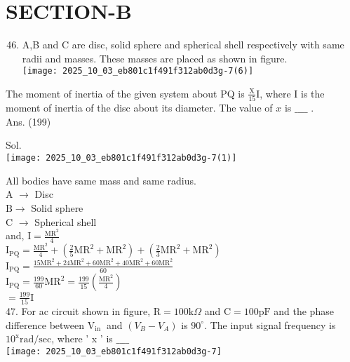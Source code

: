 \documentclass[10pt]{article}
\begin{document}
\section*{SECTION-B}
\begin{enumerate}
  \setcounter{enumi}{45}
  \item A,B and C are disc, solid sphere and spherical shell respectively with same radii and masses. These masses are placed as shown in figure.\\
\texttt{[image: 2025\_10\_03\_eb801c1f491f312ab0d3g-7(6)]}
\end{enumerate}

The moment of inertia of the given system about PQ is \(\frac{\mathrm{X}}{15} \mathrm{I}\), where I is the moment of inertia of the disc about its diameter. The value of \(x\) is \(\_\_\_\_\) .\\
Ans. (199)

Sol.\\
\texttt{[image: 2025\_10\_03\_eb801c1f491f312ab0d3g-7(1)]}

All bodies have same mass and same radius.\\
A \(\rightarrow\) Disc\\
\(\mathrm{B} \rightarrow\) Solid sphere\\
C \(\rightarrow\) Spherical shell\\
and, \(\mathrm{I}=\frac{\mathrm{MR}^{2}}{4}\)\\
\(\mathrm{I}_{\mathrm{PQ}}=\frac{\mathrm{MR}^{2}}{4}+\left(\frac{2}{5} \mathrm{MR}^{2}+\mathrm{MR}^{2}\right)+\left(\frac{2}{3} \mathrm{MR}^{2}+\mathrm{MR}^{2}\right)\)\\
\(\mathrm{I}_{\mathrm{PQ}}=\frac{15 \mathrm{MR}^{2}+24 \mathrm{MR}^{2}+60 \mathrm{MR}^{2}+40 \mathrm{MR}^{2}+60 \mathrm{MR}^{2}}{60}\)\\
\(\mathrm{I}_{\mathrm{PQ}}=\frac{199}{60} \mathrm{MR}^{2}=\frac{199}{15}\left(\frac{\mathrm{MR}^{2}}{4}\right)\)\\
\(=\frac{199}{15} \mathrm{I}\)\\
47. For ac circuit shown in figure, \(\mathrm{R}=100 \mathrm{k} \Omega\) and \(\mathrm{C}=100 \mathrm{pF}\) and the phase difference between \(\mathrm{V}_{\text {in }}\) and \(\left(V_{B}-V_{A}\right)\) is \(90^{\circ}\). The input signal frequency is \(10^{\mathrm{x}} \mathrm{rad} / \mathrm{sec}\), where ' x ' is \(\_\_\_\_\)\\
\texttt{[image: 2025\_10\_03\_eb801c1f491f312ab0d3g-7]}
\end{document}

